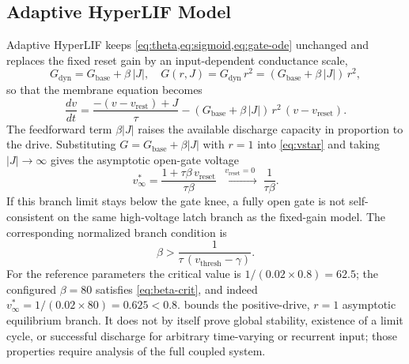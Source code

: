 \documentclass[journal]{IEEEtran}
\newcommand{\vth}{v_{\mathrm{thresh}}}
\newcommand{\vr}{v_{\mathrm{rest}}}
\newcommand{\vre}{v_{\mathrm{reset}}}
\newcommand{\Gbase}{G_{\mathrm{base}}}
\newcommand{\Gdyn}{G_{\mathrm{dyn}}}
\begin{document}
\subsection{Adaptive HyperLIF Model}\label{sec:adaptive}
Adaptive HyperLIF keeps \cref{eq:theta,eq:sigmoid,eq:gate-ode} unchanged and
replaces the fixed reset gain by an input-dependent conductance scale,
\begin{equation}
  \Gdyn = \Gbase + \beta\,|J|, \quad
  G(r,J) = \Gdyn\, r^2 = (\Gbase + \beta\,|J|)\, r^2,
  \label{eq:adaptive-gain}
\end{equation}
so that the membrane equation becomes
\begin{equation}
  \frac{dv}{dt} = \frac{-(v-\vr)+J}{\tau} - (\Gbase + \beta\,|J|)\,r^2\,(v-\vre).
  \label{eq:adaptive-ode}
\end{equation}
The feedforward term $\beta|J|$ raises the available discharge capacity in
proportion to the drive. Substituting $G=\Gbase+\beta|J|$ with $r=1$ into
\cref{eq:vstar} and taking $|J|\to\infty$ gives the asymptotic open-gate voltage
\begin{equation}
  v^\ast_\infty = \frac{1+\tau\beta\,\vre}{\tau\beta}
  \;\xrightarrow{\;\vre=0\;}\; \frac{1}{\tau\beta}. \label{eq:vinf}
\end{equation}
If this branch limit stays below the gate knee, a fully open gate is not
self-consistent on the same high-voltage latch branch as the fixed-gain model.
The corresponding normalized branch condition is
\begin{equation}
  \boxed{\;\beta > \frac{1}{\tau\,(\vth-\gamma)}.\;} \label{eq:beta-crit}
\end{equation}
For the reference parameters the critical value is
$1/(0.02\times 0.8)=62.5$; the configured $\beta=80$ satisfies
\cref{eq:beta-crit}, and indeed $v^\ast_\infty=1/(0.02\times 80)=0.625<0.8$.
 bounds the positive-drive, $r=1$ asymptotic equilibrium
branch. It does not by itself prove global stability, existence of a limit
cycle, or successful discharge for arbitrary time-varying or recurrent input;
those properties require analysis of the full coupled system.

\end{document}
